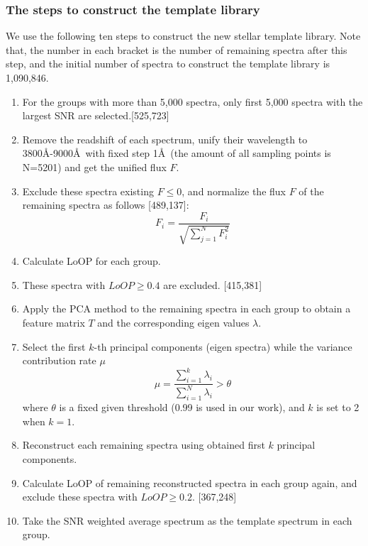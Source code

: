 \documentclass[manuscript]{aastex}
\begin{document}
\subsubsection{The steps to construct the template library}
We use the following ten steps to construct the new stellar template library.
Note that, the number in each bracket is the number of remaining spectra after this step,
and the initial number of spectra to construct the template library is 1,090,846.
\begin{enumerate}
\item For the groups with more than 5,000 spectra, only first 5,000 spectra with the largest SNR are selected.[525,723]
\item Remove the readshift of each spectrum, unify their wavelength to 3800\AA-9000\AA \ with fixed step 1\AA\ (the amount of all sampling points is N=5201) and  get the unified flux $F$.
  \item Exclude these spectra existing $F\le0$, and normalize the flux $F$ of the remaining spectra as follows [489,137]:
       \begin{equation}
        F_i=\frac{F_i}{\sqrt{\sum\limits_{j=1}^{N}F_i^2}}
       \end{equation}
 \item Calculate LoOP for each group.
 \item These spectra with  $LoOP\ge0.4$ are excluded. [415,381]
		

      \item Apply the PCA method to the remaining spectra in each group to  obtain a feature matrix $T$ and the corresponding eigen values $\lambda$.
      \item Select the first $k$-th principal components (eigen spectra) while the variance contribution rate $\mu$
      \begin{equation}
       \mu=\frac{\sum\limits_{i=1}^{k}\lambda_i}{\sum\limits_{i=1}^{N}\lambda_i}>\theta
      \end{equation}
      where $\theta$ is a fixed given threshold  (0.99 is used in our work),
       and $k$ is set to 2 when $k=1$.

     \item Reconstruct each remaining spectra using obtained first $k$ principal components.
     \item Calculate LoOP of remaining reconstructed spectra in each group again, and exclude these spectra with $LoOP\ge0.2$. [367,248]

      \item Take the SNR weighted average spectrum as the template spectrum in each group.
     \end{enumerate}
\end{document}
